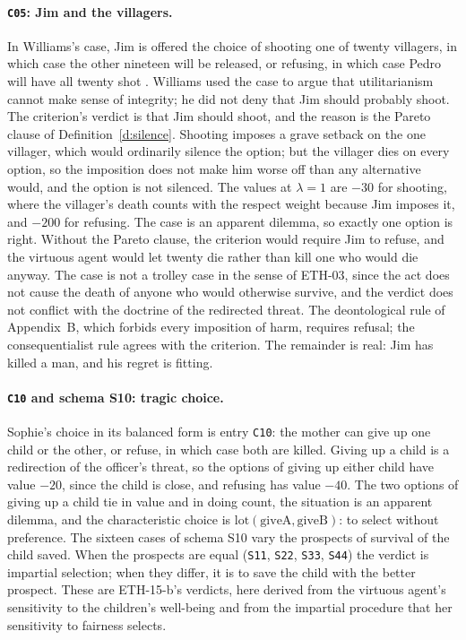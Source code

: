 \documentclass{situationist-preprint}
\newcommand{\lot}{\mathrm{lot}}
\begin{document}
\paragraph{\texttt{C05}: Jim and the villagers.} In Williams's case, Jim is offered the choice of shooting one of twenty villagers, in which case the other nineteen will be released, or refusing, in which case Pedro will have all twenty shot \citep{Williams1973}. Williams used the case to argue that utilitarianism cannot make sense of integrity; he did not deny that Jim should probably shoot. The criterion's verdict is that Jim should shoot, and the reason is the Pareto clause of Definition~\ref{d:silence}. Shooting imposes a grave setback on the one villager, which would ordinarily silence the option; but the villager dies on every option, so the imposition does not make him worse off than any alternative would, and the option is not silenced. The values at $\lambda=1$ are $-30$ for shooting, where the villager's death counts with the respect weight because Jim imposes it, and $-200$ for refusing. The case is an apparent dilemma, so exactly one option is right. Without the Pareto clause, the criterion would require Jim to refuse, and the virtuous agent would let twenty die rather than kill one who would die anyway. The case is not a trolley case in the sense of ETH-03, since the act does not cause the death of anyone who would otherwise survive, and the verdict does not conflict with the doctrine of the redirected threat. The deontological rule of Appendix~B, which forbids every imposition of harm, requires refusal; the consequentialist rule agrees with the criterion. The remainder is real: Jim has killed a man, and his regret is fitting.

\paragraph{\texttt{C10} and schema S10: tragic choice.} Sophie's choice \citep{Styron1979} in its balanced form is entry \texttt{C10}: the mother can give up one child or the other, or refuse, in which case both are killed. Giving up a child is a redirection of the officer's threat, so the options of giving up either child have value $-20$, since the child is close, and refusing has value $-40$. The two options of giving up a child tie in value and in doing count, the situation is an apparent dilemma, and the characteristic choice is $\lot(\text{giveA},\text{giveB})$: to select without preference. The sixteen cases of schema S10 vary the prospects of survival of the child saved. When the prospects are equal (\texttt{S11}, \texttt{S22}, \texttt{S33}, \texttt{S44}) the verdict is impartial selection; when they differ, it is to save the child with the better prospect. These are ETH-15-b's verdicts, here derived from the virtuous agent's sensitivity to the children's well-being and from the impartial procedure that her sensitivity to fairness selects.
\end{document}
